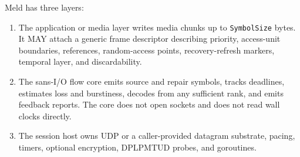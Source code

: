 \documentclass[11pt]{article}
\newcommand{\meld}{Meld}
\newcommand{\code}[1]{\ifmmode\text{\texttt{#1}}\else\texttt{#1}\fi}
\newcommand{\field}[1]{\code{#1}}
\begin{document}
\meld{} has three layers:

\begin{enumerate}
\item The application or media layer writes media chunks up to
      \field{SymbolSize} bytes. It MAY attach
      a generic frame descriptor describing priority, access-unit boundaries,
      references, random-access points, recovery-refresh markers, temporal layer,
      and discardability.
\item The sans-I/O flow core emits source and repair symbols, tracks deadlines,
      estimates loss and burstiness, decodes from any sufficient rank, and emits
      feedback reports. The core does not open sockets and does not read wall
      clocks directly.
\item The session host owns UDP or a caller-provided datagram substrate, pacing,
      timers, optional encryption, DPLPMTUD probes, and goroutines.
\end{enumerate}
\end{document}

